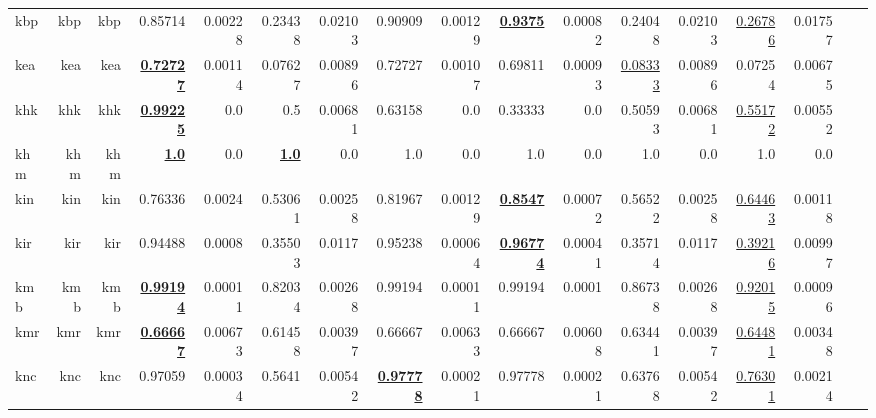 \documentclass[11pt]{article}
\begin{document}
\begin{table*}[h]
{\begin{tabular}{lrrrrrrrrrrrrrrrr}
kbp         & kbp         & kbp         & 0.85714         & 0.00228         & 0.23438         & 0.02103         & 0.90909         & 0.00129         & \textbf{\underline{0.9375}}         & 0.00082         & 0.24048         & 0.02103         & \underline{0.26786}         & 0.01757         \\
kea         & kea         & kea         & \textbf{\underline{0.72727}}         & 0.00114         & 0.07627         & 0.00896         & 0.72727         & 0.00107         & 0.69811         & 0.00093         & \underline{0.08333}         & 0.00896         & 0.07254         & 0.00675         \\
khk         & khk         & khk         & \textbf{\underline{0.99225}}         & 0.0         & 0.5         & 0.00681         & 0.63158         & 0.0         & 0.33333         & 0.0         & 0.50593         & 0.00681         & \underline{0.55172}         & 0.00552         \\
khm         & khm         & khm         & \textbf{\underline{1.0}}         & 0.0         & \textbf{\underline{1.0}}         & 0.0         & 1.0         & 0.0         & 1.0         & 0.0         & 1.0         & 0.0         & 1.0         & 0.0         \\
kin         & kin         & kin         & 0.76336         & 0.0024         & 0.53061         & 0.00258         & 0.81967         & 0.00129         & \textbf{\underline{0.8547}}         & 0.00072         & 0.56522         & 0.00258         & \underline{0.64463}         & 0.00118         \\
kir         & kir         & kir         & 0.94488         & 0.0008         & 0.35503         & 0.0117         & 0.95238         & 0.00064         & \textbf{\underline{0.96774}}         & 0.00041         & 0.35714         & 0.0117         & \underline{0.39216}         & 0.00997         \\
kmb         & kmb         & kmb         & \textbf{\underline{0.99194}}         & 0.00011         & 0.82034         & 0.00268         & 0.99194         & 0.00011         & 0.99194         & 0.0001         & 0.86738         & 0.00268         & \underline{0.92015}         & 0.00096         \\
kmr         & kmr         & kmr         & \textbf{\underline{0.66667}}         & 0.00673         & 0.61458         & 0.00397         & 0.66667         & 0.00633         & 0.66667         & 0.00608         & 0.63441         & 0.00397         & \underline{0.64481}         & 0.00348         \\
knc         & knc         & knc         & 0.97059         & 0.00034         & 0.5641         & 0.00542         & \textbf{\underline{0.97778}}         & 0.00021         & 0.97778         & 0.00021         & 0.63768         & 0.00542         & \underline{0.76301}         & 0.00214         \\

\end{tabular}}
\end{table*}
\end{document}
